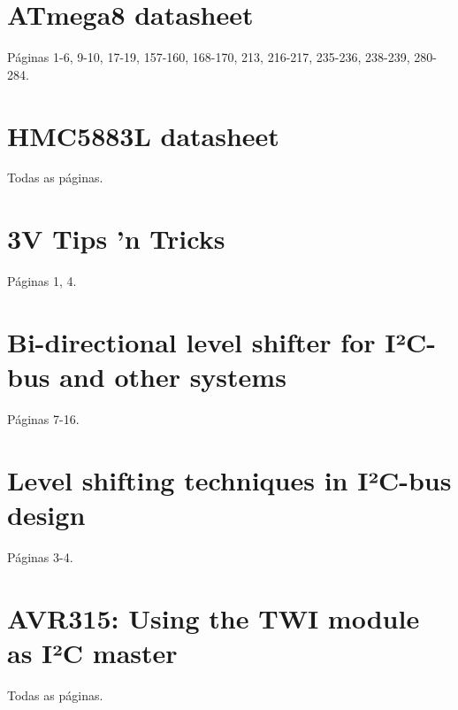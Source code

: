 \documentclass[brazil,pagestart=firstchapter]{abnt}
\begin{document}
\anexo


\chapter{ATmega8 datasheet}
\label{anx:atmega8_datasheet}

Páginas 1-6, 9-10, 17-19, 157-160, 168-170, 213, 216-217, 235-236, 238-239, 280-284. \cite{ATmega8}




\chapter{HMC5883L datasheet}
\label{anx:hmc5883l_datasheet}

Todas as páginas. \cite{HMC5883L}




\chapter{3V Tips 'n Tricks}
\label{anx:3vtipsandtricks_pdf}

Páginas 1, 4. \cite{3vtipsandtricks}




\chapter{Bi-directional level shifter for I²C-bus and other systems}
\label{anx:AN97055_pdf}

Páginas 7-16. \cite{AN97055}




\chapter{Level shifting techniques in I²C-bus design}
\label{anx:AN10441_pdf}

Páginas 3-4. \cite{AN10441}




\chapter{AVR315: Using the TWI module as I²C master}
\label{anx:avr315_pdf}

Todas as páginas. \cite{AVR315}


\end{document}
